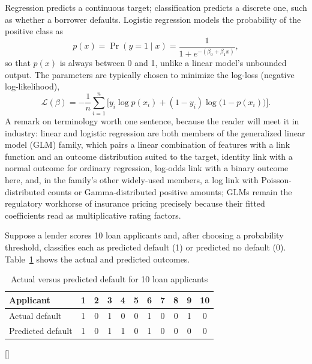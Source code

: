 \documentclass[../ai_in_finance]{subfiles}
\begin{document}
Regression predicts a continuous target; classification predicts a discrete one, such as whether a borrower defaults. Logistic regression models the probability of the positive class as
\begin{equation*}
p(x) = \Pr(y=1 \mid x) = \frac{1}{1 + e^{-(\beta_0 + \beta_1 x)}},
\end{equation*}
so that $p(x)$ is always between 0 and 1, unlike a linear model's unbounded output. The parameters are typically chosen to minimize the log-loss (negative log-likelihood),
\begin{equation*}
\mathcal{L}(\beta) = -\frac{1}{n}\sum_{i=1}^n \Big[y_i \log p(x_i) + (1-y_i)\log\big(1-p(x_i)\big)\Big].
\end{equation*}
A remark on terminology worth one sentence, because the reader will meet it in industry: linear and logistic regression are both members of the generalized linear model (GLM) family, which pairs a linear combination of features with a link function and an outcome distribution suited to the target, identity link with a normal outcome for ordinary regression, log-odds link with a binary outcome here, and, in the family's other widely-used members, a log link with Poisson-distributed counts or Gamma-distributed positive amounts; GLMs remain the regulatory workhorse of insurance pricing precisely because their fitted coefficients read as multiplicative rating factors.

Suppose a lender scores 10 loan applicants and, after choosing a probability threshold, classifies each as predicted default (1) or predicted no default (0). Table~\ref{tab:confusion_data} shows the actual and predicted outcomes.

\begin{table}[htbp]
\centering
\begin{lrbox}{\bookmeasuredbox}
\begin{tabular}{lcccccccccc}
\toprule
Applicant & 1 & 2 & 3 & 4 & 5 & 6 & 7 & 8 & 9 & 10 \\
\midrule
Actual default    & 1 & 0 & 1 & 0 & 0 & 1 & 0 & 0 & 1 & 0 \\
Predicted default & 1 & 0 & 1 & 1 & 0 & 1 & 0 & 0 & 0 & 0 \\
\bottomrule
\end{tabular}
\end{lrbox}
\ifdim\wd\bookmeasuredbox<0.65\linewidth
\setlength{\bookcapwidth}{0.65\linewidth}
\else
\setlength{\bookcapwidth}{\wd\bookmeasuredbox}
\fi
{}[\bookcapwidth]{
\usebox{\bookmeasuredbox}
}{
\caption{Actual versus predicted default for 10 loan applicants}
\label{tab:confusion_data}
}
\end{table}
\end{document}
